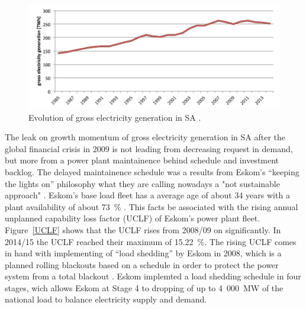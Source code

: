 \begin{figure}[htbp]  
\centering
\includegraphics[width=1\linewidth]{FIG/electrGross}
\caption[Evolution of gross electricity generation in SA.]{Evolution of gross electricity generation in SA \cite{BP2015c}.}\label{electrGross}
\end{figure}
The leak on growth momentum of gross electricity generation in SA after the global financial crisis in 2009 is not leading from decreasing request in demand, but more from a power plant maintainence behind schedule and investment backlog. The delayed maintainence schedule was a results from Eskom's “keeping the lights on” philosophy what they are calling nowadays a "not sustainable approach" \cite{Eskom2014}. Eskom’s base load fleet has a average age of about 34 years with a plant availability of about 73~\% \cite{Eskom2015c}. This facts be associated with the rising annual unplanned capability loss factor (UCLF) of Eskom’s power plant fleet. Figure~\ref{UCLF} shows that the UCLF rises from 2008/09 on significantly. In 2014/15 the UCLF reached their maximum of 15.22~\%. The rising UCLF comes in hand with implementing of “load shedding” by Eskom in 2008, which is a planned rolling blackouts based on a schedule in order to protect the power system from a total blackout \cite{Eskom2015d}. Eskom implemted a load shedding schedule in four stages, wich allows Eskom at Stage 4 to dropping of up to 4~000~MW of the national load to balance electricity supply and demand. \cite{Eskom2015e}


